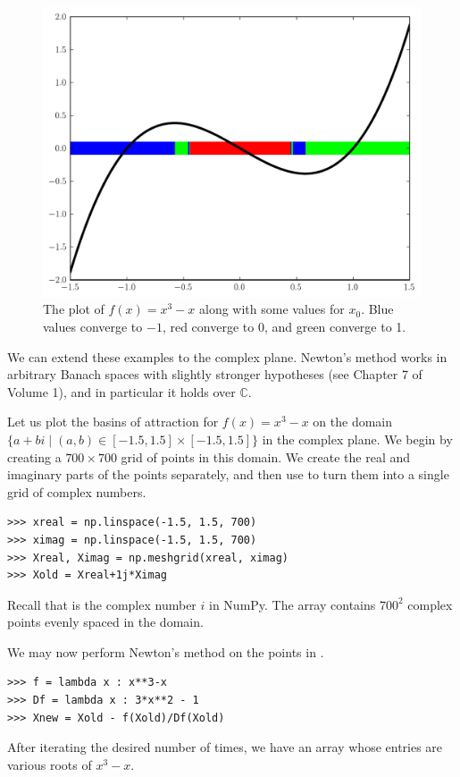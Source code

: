 \begin{figure}
\begin{center}
\includegraphics[scale=0.5]{fractal1d}
\caption{The plot of $f(x) = x^3 -x$ along with some values for $x_0$.
Blue values converge to $-1$, red converge to 0, and green converge to 1.}
\label{fig:fractal_1d}
\end{center}
\end{figure}

We can extend these examples to the complex plane. 
Newton's method works in arbitrary Banach spaces with slightly stronger hypotheses (see Chapter 7 of Volume 1), and in particular it holds over $\mathbb{C}$.

Let us plot the basins of attraction for $f(x) = x^3-x$ on the domain $\{a+bi \mid (a, b) \in [-1.5, 1.5] \times [-1.5, 1.5] \}$ in the complex plane.
We begin by creating a $700 \times 700$ grid of points in this domain. 
We create the real and imaginary parts of the points separately, and then use  to turn them into a single grid of complex numbers.
\begin{lstlisting}
>>> xreal = np.linspace(-1.5, 1.5, 700)
>>> ximag = np.linspace(-1.5, 1.5, 700)
>>> Xreal, Ximag = np.meshgrid(xreal, ximag)
>>> Xold = Xreal+1j*Ximag
\end{lstlisting}
Recall that  is the complex number $i$ in NumPy. 
The array  contains $700^2$ complex points evenly spaced in the domain.

We may now perform Newton's method on the points in . 
\begin{lstlisting}
>>> f = lambda x : x**3-x
>>> Df = lambda x : 3*x**2 - 1
>>> Xnew = Xold - f(Xold)/Df(Xold)
\end{lstlisting}
After iterating the desired number of times, we have an array  whose entries are various roots of $x^3-x$.

